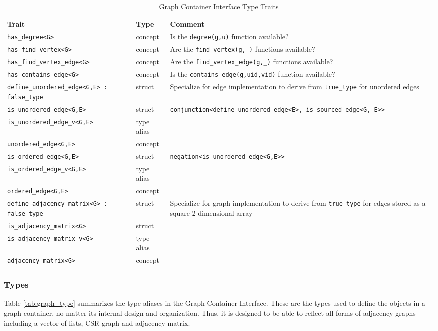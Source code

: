 \documentclass[10pt,onecolumn]{article}
\newcommand{\tcode}[1]{\lstinline[breaklines=true]{#1}}
\begin{document}
\begin{table}[h!]
\begin{center}
{\begin{tabular}{l l L{7.0cm}}
\hline
    \textbf{Trait} & \textbf{Type} & \textbf{Comment} \\
\hline
    \tcode{has_degree<G>} & concept & Is the \tcode{degree(g,u)} function available? \\
    \tcode{has_find_vertex<G>} & concept & Are the \tcode{find_vertex(g,_)} functions available? \\
    \tcode{has_find_vertex_edge<G>} & concept & Are the \tcode{find_vertex_edge(g,_)} functions available?\\
    \tcode{has_contains_edge<G>} & concept & Is the \tcode{contains_edge(g,uid,vid)} function available?\\
\hline
    \tcode{define_unordered_edge<G,E> : false_type} & struct & Specialize for edge implementation to derive from \tcode{true_type} for unordered edges \\
    \tcode{is_unordered_edge<G,E>} & struct & \tcode{conjunction<define_unordered_edge<E>, is_sourced_edge<G, E>>} \\
    \tcode{is_unordered_edge_v<G,E>} & type alias & \\
    \tcode{unordered_edge<G,E>} & concept & \\
\hline
    \tcode{is_ordered_edge<G,E>} & struct & \tcode{negation<is_unordered_edge<G,E>>} \\
    \tcode{is_ordered_edge_v<G,E>} & type alias & \\
    \tcode{ordered_edge<G,E>} & concept & \\
\hline
    \tcode{define_adjacency_matrix<G> : false_type} & struct & Specialize for graph implementation to derive from \tcode{true_type} for edges stored as a square 2-dimensional array \\
    \tcode{is_adjacency_matrix<G>} & struct & \\
    \tcode{is_adjacency_matrix_v<G>} & type alias & \\
    \tcode{adjacency_matrix<G>} & concept & \\
\hline
\end{tabular}}
\caption{Graph Container Interface Type Traits}
\label{tab:graph_traits}
\end{center}
\end{table}


\subsubsection{Types}
Table \ref{tab:graph_type} summarizes the type aliases in the Graph Container Interface. These are the types used to define the objects in a graph container, no matter its internal design and organization. Thus, it is designed to be able to reflect all forms of adjacency graphs including a vector of lists, CSR graph and adjacency matrix.
\end{document}
